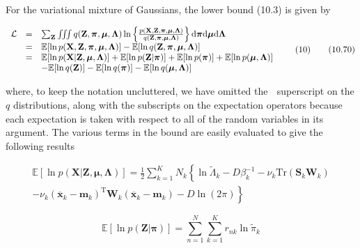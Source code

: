 \documentclass[
  10
]{article}
\begin{document}
For the variational mixture of Gaussians, the lower bound (10.3) is
given by

\[
\begin{array}{r c l} \mathcal {L} & = & \sum_ {\mathbf {Z}} \iiint q (\mathbf {Z}, \boldsymbol {\pi}, \boldsymbol {\mu}, \boldsymbol {\Lambda}) \ln \left\{\frac {p (\mathbf {X} , \mathbf {Z} , \boldsymbol {\pi} , \boldsymbol {\mu} , \boldsymbol {\Lambda})}{q (\mathbf {Z} , \boldsymbol {\pi} , \boldsymbol {\mu} , \boldsymbol {\Lambda})} \right\} \mathrm{d} \boldsymbol {\pi} \mathrm{d} \boldsymbol {\mu} \mathrm{d} \boldsymbol {\Lambda} \\ & = & \mathbb {E} [ \ln p (\mathbf {X}, \mathbf {Z}, \boldsymbol {\pi}, \boldsymbol {\mu}, \boldsymbol {\Lambda}) ] - \mathbb {E} [ \ln q (\mathbf {Z}, \boldsymbol {\pi}, \boldsymbol {\mu}, \boldsymbol {\Lambda}) ] \\ & = & \mathbb {E} [ \ln p (\mathbf {X} | \mathbf {Z}, \boldsymbol {\mu}, \boldsymbol {\Lambda}) ] + \mathbb {E} [ \ln p (\mathbf {Z} | \boldsymbol {\pi}) ] + \mathbb {E} [ \ln p (\boldsymbol {\pi}) ] + \mathbb {E} [ \ln p (\boldsymbol {\mu}, \boldsymbol {\Lambda}) ] \\ & & - \mathbb {E} [ \ln q (\mathbf {Z}) ] - \mathbb {E} [ \ln q (\boldsymbol {\pi}) ] - \mathbb {E} [ \ln q (\boldsymbol {\mu}, \boldsymbol {\Lambda}) ] \end{array} \tag {10}\tag{10.70}
\]

where, to keep the notation uncluttered, we have omitted the 
superscript on the \(q\) distributions, along with the subscripts on the
expectation operators because each expectation is taken with respect to
all of the random variables in its argument. The various terms in the
bound are easily evaluated to give the following results

\[
\begin{array}{c} \mathbb {E} [ \ln p (\mathbf {X} | \mathbf {Z}, \boldsymbol {\mu}, \boldsymbol {\Lambda}) ] = \frac {1}{2} \sum_ {k = 1} ^ {K} N _ {k} \left\{\ln \widetilde {\Lambda} _ {k} - D \beta_ {k} ^ {- 1} - \nu_ {k} \mathrm{Tr} (\mathbf {S} _ {k} \mathbf {W} _ {k}) \right. \\ \left. - \nu_ {k} (\overline {{\mathbf {x}}} _ {k} - \mathbf {m} _ {k}) ^ {\mathrm{T}} \mathbf {W} _ {k} (\overline {{\mathbf {x}}} _ {k} - \mathbf {m} _ {k}) - D \ln (2 \pi) \right\} \end{array}\tag{10.71}
\]

\[
\mathbb {E} [ \ln p (\mathbf {Z} | \boldsymbol {\pi}) ] = \sum_ {n = 1} ^ {N} \sum_ {k = 1} ^ {K} r _ {n k} \ln \widetilde {\pi} _ {k}\tag{10.72}
\]
\end{document}
